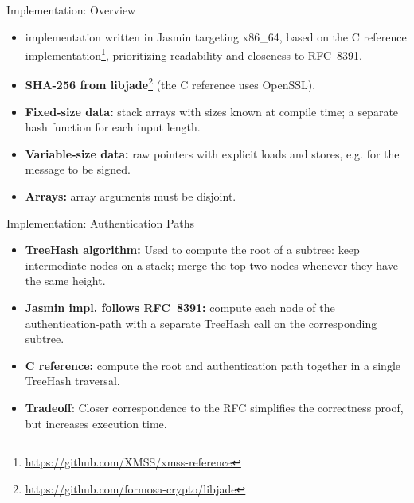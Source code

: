 \begingroup
\renewcommand{\footnoterule}{}
\begin{frame}{Implementation: Overview}
  \begin{itemize}
      \setlength{\itemsep}{3mm}
    \item \xmssmt implementation written in Jasmin targeting x86\_64, based on
      the C reference
      implementation\footnote[frame]{\tiny\url{https://github.com/XMSS/xmss-reference}},
      prioritizing readability and closeness to RFC~8391.
    \item \textbf{SHA-256 from
      libjade}\footnote{\tiny\url{https://github.com/formosa-crypto/libjade}}
      (the C reference uses OpenSSL).
    \item \textbf{Fixed-size data:} stack arrays with sizes known at compile
      time; a separate hash function for each input length.
    \item \textbf{Variable-size data:} raw pointers with explicit
      loads and stores, e.g. for the message to be signed.
    \item \textbf{Arrays:} array arguments must be disjoint.
  \end{itemize}
\end{frame}
\endgroup

\begin{frame}{Implementation: Authentication Paths}
  \begin{itemize}
      \setlength{\itemsep}{4mm}
    \item \textbf{TreeHash algorithm:} Used to compute the root of a
      subtree: keep intermediate nodes on a stack;
      merge the top two nodes whenever they have the same height.
    \item \textbf{Jasmin impl. follows RFC~8391:} compute each node
      of the authentication-path
      with a separate TreeHash call on the corresponding subtree.
    \item \textbf{C reference:} compute the root and authentication path
      together in a single TreeHash traversal.
    \item \textbf{Tradeoff}: Closer correspondence to the RFC
      simplifies the correctness proof, but increases execution time.
  \end{itemize}
\end{frame}

